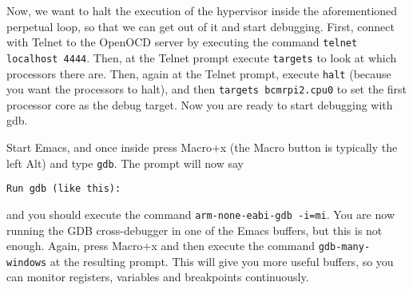 \documentclass[a4paper,11pt,reqno]{amsart}
\begin{document}
Now, we want to halt the execution of the hypervisor inside the aforementioned perpetual loop, so that we can get out of it and start debugging. First, connect with Telnet to the OpenOCD server by executing the command \texttt{telnet localhost 4444}. Then, at the Telnet prompt execute \texttt{targets} to look at which processors there are. Then, again at the Telnet prompt, execute \texttt{halt} (because you want the processors to halt), and then \texttt{targets bcmrpi2.cpu0} to set the first processor core as the debug target. Now you are ready to start debugging with gdb.

Start Emacs, and once inside press Macro+x (the Macro button is typically the left Alt) and type \texttt{gdb}. The prompt will now say

\begin{verbatim}
Run gdb (like this):
\end{verbatim}

and you should execute the command \texttt{arm-none-eabi-gdb -i=mi}. You are now running the GDB cross-debugger in one of the Emacs buffers, but this is not enough. Again, press Macro+x and then execute the command \texttt{gdb-many-windows} at the resulting prompt. This will give you more useful buffers, so you can monitor registers, variables and breakpoints continuously.
\end{document}
